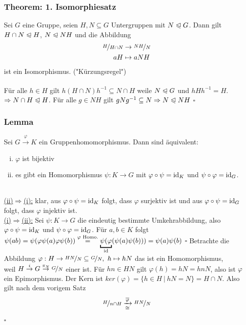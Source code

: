 \subsubsection*{Theorem: 1. Isomorphiesatz}
Sei $G$ eine Gruppe, seien $H,N\subseteq G$ Untergruppen mit $N\trianglelefteqslant G$. Dann gilt $H\cap N\trianglelefteqslant H$, $N \trianglelefteqslant NH$ und die Abbildung
\begin{equation*}
\begin{aligned}
	\nicefrac{H}{H\cap N} &\to \nicefrac{NH}{N}\\
	aH &\mapsto aNH
\end{aligned}
\end{equation*}
ist ein Isomorphismus. \qquad ("Kürzungsregel")\\

\\
Für alle $h\in H$ gilt $h(H\cap N)h^{-1}\subseteq N\cap H$ weile $N\trianglelefteqslant G$ und $hHh^{-1}=H$. $\Rightarrow N\cap H \trianglelefteqslant H$. Für alle $g\in NH$ gilt $gNg^{-1}\subseteq N \Rightarrow N\trianglelefteqslant NH$
\hfill $\square$

\subsubsection*{Lemma}
Sei $G\stackrel{\varphi}{\to}K$ ein Gruppenhomomorphismus. Dann sind äquivalent:\\
\begin{enumerate}[(i)]
	\item $\varphi$ ist bijektiv
	\item es gibt ein Homomorphismus $\psi:K\to G$ mit $\varphi \circ \psi=\operatorname{id}_K$ und $\psi\circ\varphi=\operatorname{id}_G$.
\end{enumerate}
\\
\uline{(ii)$\Rightarrow$(i):} klar, aus $\varphi\circ\psi=\operatorname{id}_K$ folgt, dass $\varphi$ surjektiv ist und aus $\varphi\circ\psi=\operatorname{id}_G$ folgt, dass $\varphi$ injektiv ist.\\

\uline{(i)$\Rightarrow$(ii):} Sei $\psi:K\to G$ die eindeutig bestimmte Umkehrabbildung, also $\varphi \circ \psi=\operatorname{id}_K$ und $\psi\circ\varphi=\operatorname{id}_G$. Für $a,b\in K$ folgt $\psi(ab)=\psi(\varphi\psi(a)\varphi\psi(b)) \stackrel{\varphi \text{ Homo.}}{=}\underbracket{\psi(\varphi}_{\id}(\psi(a)\psi(b)))= \psi(a)\psi(b)$
\hfill $\square$
\vspace{2cm}
Betrachte die Abbildung $\varphi:H\to \nicefrac{HN}{N}\subseteq \nicefrac{G}{N},~h\mapsto hN$ das ist ein Homomorphismus,\\ weil $H\stackrel{i}{\to}G\stackrel{\pi_N}{\to}\nicefrac{G}{N}$ einer ist. Für $hn\in HN$ gilt $\varphi(h)=hN=hnN$, also ist $\varphi$ ein Epimorphismus. Der Kern ist $ker(\varphi)=\{h\in H~|~hN=N \}=H\cap N$. Also gilt nach dem vorigem Satz 
\[\nicefrac{H}{n\cap H}\xrightarrow[\cong]{\overline{\varphi}}\nicefrac{HN}{N}\]
\hfill $\square$
\newpage

